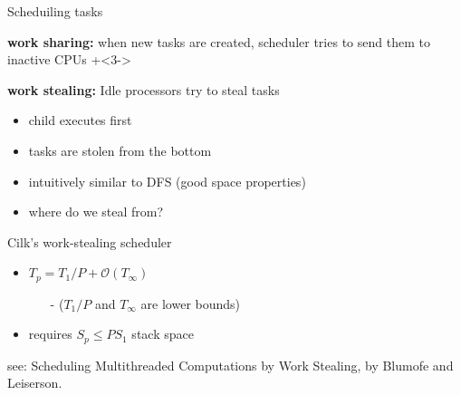 \documentclass[13pt]{beamer}
\begin{document}
\begin{frame}{Scheduiling tasks}{}
\begin{overlayarea}{\textwidth}{4.4cm}
 {
    {\bfseries work sharing:} when new tasks are created, scheduler
    tries to send them to inactive CPUs
}
\onslide+<3->{%
{\bfseries work stealing:} Idle processors try to steal tasks
\begin{itemize}
    \item child executes first
    \item tasks are stolen from the bottom
    \item intuitively similar to DFS (good space properties)
    \item where do we steal from? 
\end{itemize}
}
\end{overlayarea}
\end{frame}

\begin{frame}{Cilk's work-stealing scheduler}

    \begin{itemize}
        \item $T_p = T_1 / P + \mathcal{O}(T_\infty)$ \\
        \begin{itemize}
            \item[-] {\small ($T_1 / P$ and $T_\infty$ are lower bounds)}
        \end{itemize}
        \bigskip
        \item requires $S_p \leq P S_1$ stack space
    \end{itemize}

    \vfill
    see: Scheduling Multithreaded Computations by Work Stealing, by Blumofe and
    Leiserson.
\end{frame}
\end{document}
